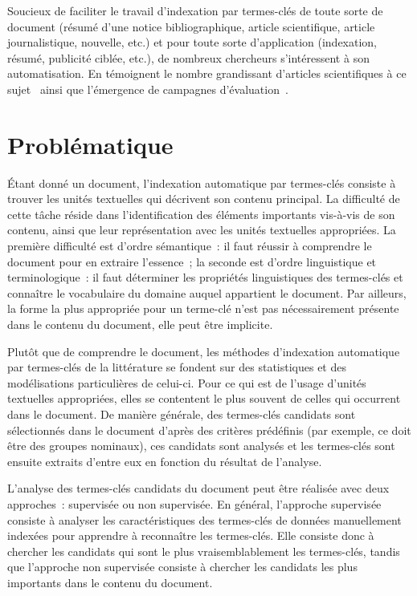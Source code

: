     Soucieux de faciliter le travail d'indexation par termes-clés de toute sorte
    de document (résumé d'une notice bibliographique, article scientifique,
    article journalistique, nouvelle, etc.) et pour toute sorte d'application
    (indexation, résumé, publicité ciblée, etc.), de nombreux chercheurs
    s'intéressent à son automatisation. En témoignent le nombre grandissant
    d'articles scientifiques à ce sujet~\cite{hasan2014state_of_the_art} ainsi
    que l'émergence de campagnes
    d'évaluation~\cite{kim2010semeval,paroubek2012deft}.


  \section{Problématique}
  \label{sec:main-introduction-problem_statement}
    Étant donné un document, l'indexation automatique par termes-clés consiste à
    trouver les unités textuelles qui décrivent son contenu principal. La
    difficulté de cette tâche réside dans l'identification des éléments
    importants vis-à-vis de son contenu, ainsi que leur représentation avec les
    unités textuelles appropriées. La première difficulté est d'ordre
    sémantique~: il faut réussir à comprendre le document pour en extraire
    l'essence~; la seconde est d'ordre linguistique et terminologique~: il faut
    déterminer les propriétés linguistiques des termes-clés et connaître le
    vocabulaire du domaine auquel appartient le document. Par ailleurs, la forme
    la plus appropriée pour un terme-clé n'est pas nécessairement présente dans
    le contenu du document, elle peut être implicite.

    Plutôt que de comprendre le document, les méthodes d'indexation automatique
    par termes-clés de la littérature se fondent sur des statistiques et
    des modélisations particulières de celui-ci. Pour ce qui est de l'usage
    d'unités textuelles appropriées, elles se contentent le plus souvent de
    celles qui occurrent dans le document. De manière générale, des
    termes-clés candidats sont sélectionnés dans le document d'après des
    critères prédéfinis (par exemple, ce doit être des groupes nominaux), ces
    candidats sont analysés et les termes-clés sont ensuite extraits d'entre eux
    en fonction du résultat de l'analyse.

    L'analyse des termes-clés candidats du document peut être réalisée avec deux
    approches~: supervisée ou non supervisée. En général, l'approche supervisée
    consiste à analyser les caractéristiques des termes-clés de données
    manuellement indexées pour apprendre à reconnaître les termes-clés. Elle
    consiste donc à chercher les candidats qui sont le plus vraisemblablement
    les termes-clés, tandis que l'approche non supervisée consiste à chercher
    les candidats les plus importants dans le contenu du document.
    
